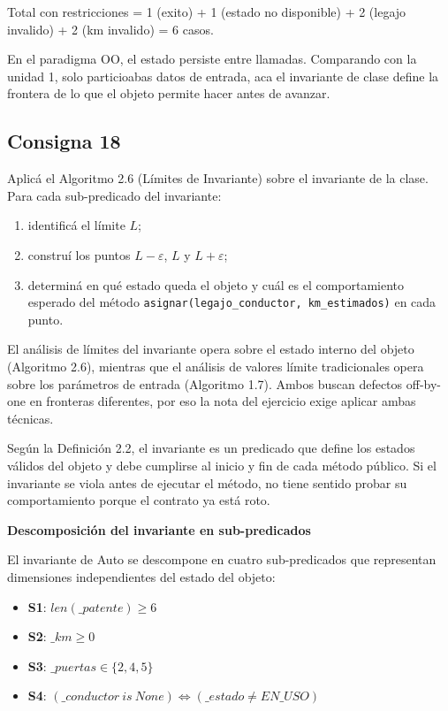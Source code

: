 Total con restricciones = 1 (exito) + 1 (estado no disponible) + 2 (legajo invalido) + 2 (km invalido) = 6 casos.

En el paradigma OO, el estado persiste entre llamadas. Comparando con la unidad 1, solo particioabas datos de entrada, aca el invariante de clase define la frontera de lo que el objeto permite hacer antes de avanzar.


\subsection{Consigna 18}
Aplicá el Algoritmo 2.6 (Límites de Invariante) sobre el invariante de la clase. Para cada sub-predicado del invariante:
\begin{enumerate}
    \item identificá el límite $L$;
    \item construí los puntos $L-\varepsilon$, $L$ y $L+\varepsilon$;
    \item determiná en qué estado queda el objeto y cuál es el comportamiento esperado del método \texttt{asignar(legajo\_conductor, km\_estimados)} en cada punto.
\end{enumerate}

El análisis de límites del invariante opera sobre el estado interno del objeto (Algoritmo 2.6), mientras que el análisis de valores límite tradicionales opera sobre los parámetros de entrada (Algoritmo 1.7). Ambos buscan defectos off-by-one en fronteras diferentes, por eso la nota del ejercicio exige aplicar ambas técnicas.

Según la Definición 2.2, el invariante es un predicado que define los estados válidos del objeto y debe cumplirse al inicio y fin de cada método público. Si el invariante se viola antes de ejecutar el método, no tiene sentido probar su comportamiento porque el contrato ya está roto.

\textbf{Descomposición del invariante en sub-predicados}

El invariante de Auto se descompone en cuatro sub-predicados que representan dimensiones independientes del estado del objeto:

\begin{itemize}
    \item \textbf{S1}: $len(\_patente) \geq 6$
    \item \textbf{S2}: $\_km \geq 0$
    \item \textbf{S3}: $\_puertas \in \{2, 4, 5\}$
    \item \textbf{S4}: $(\_conductor\ is\ None) \iff (\_estado \neq EN\_USO)$
\end{itemize}

